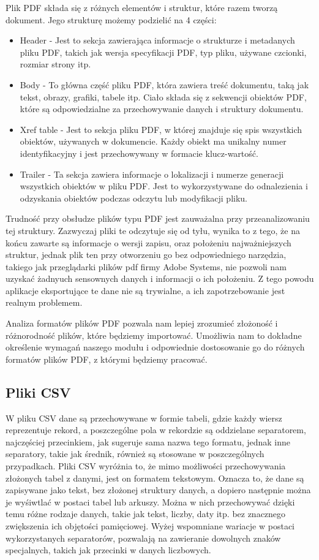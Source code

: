 \documentclass[a4paper,twoside,12pt]{book}
\begin{document}
Plik PDF składa się z różnych elementów i struktur, które razem tworzą dokument. Jego strukturę możemy podzielić na 4 części: 
\begin{itemize}
\item Header - Jest to sekcja zawierająca informacje o strukturze i metadanych pliku PDF, takich jak wersja specyfikacji PDF, typ pliku, używane czcionki, rozmiar strony itp.
\item Body - To główna część pliku PDF, która zawiera treść dokumentu, taką jak tekst, obrazy, grafiki, tabele itp. Ciało składa się z sekwencji obiektów PDF, które są odpowiedzialne za przechowywanie danych i struktury dokumentu.
\item Xref table - Jest to sekcja pliku PDF, w której znajduje się spis wszystkich obiektów, używanych w dokumencie. Każdy obiekt ma unikalny numer identyfikacyjny i jest przechowywany w formacie klucz-wartość.
\item Trailer - Ta sekcja zawiera informacje o lokalizacji i numerze generacji wszystkich obiektów w pliku PDF. Jest to wykorzystywane do odnalezienia i odzyskania obiektów podczas odczytu lub modyfikacji pliku.
\end{itemize}

Trudność przy obsłudze plików typu PDF jest zauważalna przy przeanalizowaniu tej struktury. Zazwyczaj pliki te odczytuje się od tyłu, wynika to z tego, że na końcu zawarte są informacje o wersji zapisu, oraz położeniu najważniejszych struktur, jednak plik ten przy otworzeniu go bez odpowiedniego narzędzia, takiego jak przeglądarki plików pdf firmy Adobe Systems, nie pozwoli nam uzyskać żadnyuch sensownych danych i informacji o ich położeniu. Z tego powodu aplikacje eksportujące te dane nie są trywialne, a ich zapotrzebowanie jest realnym problemem.

Analiza formatów plików PDF pozwala nam lepiej zrozumieć złożoność i różnorodność plików, które będziemy importować. Umożliwia nam to dokładne określenie wymagań naszego modułu i odpowiednie dostosowanie go do różnych formatów plików PDF, z którymi będziemy pracować.

\subsection{Pliki CSV}

W pliku CSV dane są przechowywane w formie tabeli, gdzie każdy wiersz reprezentuje rekord, a poszczególne pola w rekordzie są oddzielane separatorem, najczęściej przecinkiem, jak sugeruje sama nazwa tego formatu, jednak inne separatory, takie jak średnik, również są stosowane w poszczególnych przypadkach. Pliki CSV wyróżnia to, że mimo możliwości przechowywania złożonych tabel z danymi, jest on formatem tekstowym. Oznacza to, że dane są zapisywane jako tekst, bez złożonej struktury danych, a dopiero następnie można je wyśiwtlać w postaci tabel lub arkuszy. Można w nich przechowywać dzięki temu różne rodzaje danych, takie jak tekst, liczby, daty itp. bez znacznego zwiększenia ich objętości pamięciowej. Wyżej wspomniane wariacje w postaci wykorzystanych separatorów, pozwalają na zawieranie dowolnych znaków specjalnych, takich jak przecinki w danych liczbowych.
\end{document}
